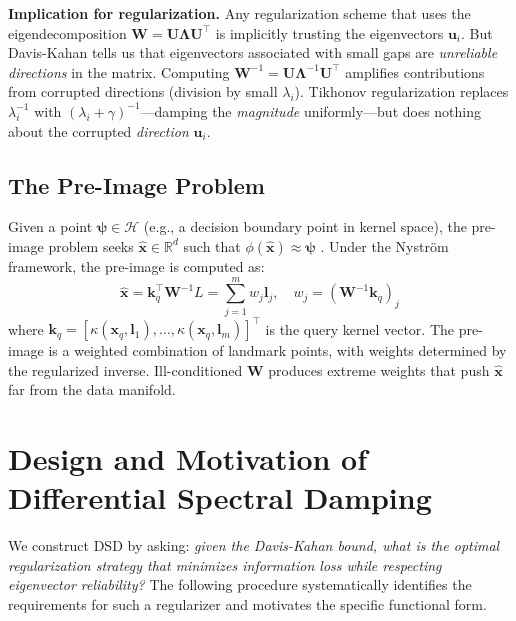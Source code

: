 \documentclass[preprint,review,12pt]{elsarticle}
\begin{document}
\textbf{Implication for regularization.} Any regularization scheme that uses the eigendecomposition $\bm{W} = \bm{U}\bm{\Lambda}\bm{U}^\top$ is implicitly trusting the eigenvectors $\bm{u}_i$. But Davis-Kahan tells us that eigenvectors associated with small gaps are \emph{unreliable directions} in the matrix. Computing $\bm{W}^{-1} = \bm{U}\bm{\Lambda}^{-1}\bm{U}^\top$ amplifies contributions from corrupted directions (division by small $\lambda_i$). Tikhonov regularization replaces $\lambda_i^{-1}$ with $(\lambda_i + \gamma)^{-1}$---damping the \emph{magnitude} uniformly---but does nothing about the corrupted \emph{direction} $\bm{u}_i$.

\subsection{The Pre-Image Problem}

Given a point $\bm{\psi} \in \mathcal{H}$ (e.g., a decision boundary point in kernel space), the pre-image problem seeks $\hat{\bm{x}} \in \mathbb{R}^d$ such that $\phi(\hat{\bm{x}}) \approx \bm{\psi}$ \cite{kwok2004preimage}. Under the Nystr\"{o}m framework, the pre-image is computed as:
\begin{equation}
\hat{\bm{x}} = \bm{k}_q^\top \bm{W}^{-1} L = \sum_{j=1}^m w_j \bm{l}_j, \quad w_j = (\bm{W}^{-1} \bm{k}_q)_j
\label{eq:preimage}
\end{equation}
where $\bm{k}_q = [\kappa(\bm{x}_q, \bm{l}_1), \ldots, \kappa(\bm{x}_q, \bm{l}_m)]^\top$ is the query kernel vector. The pre-image is a weighted combination of landmark points, with weights determined by the regularized inverse. Ill-conditioned $\bm{W}$ produces extreme weights that push $\hat{\bm{x}}$ far from the data manifold.


\section{Design and Motivation of Differential Spectral Damping}
\label{sec:derivation}

We construct DSD by asking: \emph{given the Davis-Kahan bound, what is the optimal regularization strategy that minimizes information loss while respecting eigenvector reliability?} The following procedure systematically identifies the requirements for such a regularizer and motivates the specific functional form.
\end{document}
